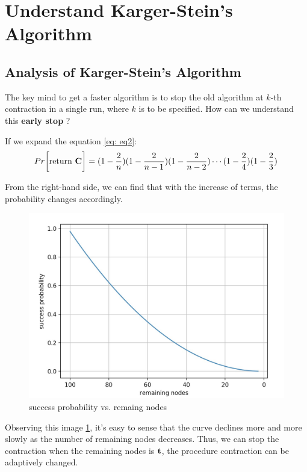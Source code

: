 \documentclass[a4paper, 12pt, titlepage]{article}
\begin{document}
\section{Understand Karger-Stein's Algorithm}

\subsection{Analysis of Karger-Stein's Algorithm}
The key mind to get a faster algorithm is to stop the old algorithm at $k$-th contraction in a single run, where $k$ is to be specified.
How can we understand this \textbf{early stop} ? 

If we expand the equation \ref{eq: eq2}:
\begin{equation}\label{eq: eq4}
    Pr \bigg[ \text{return \textbf{C}} \bigg] = (1 - \frac{2}{n})(1 - \frac{2}{n - 1})(1 - \frac{2}{n - 2}) \cdots (1- \frac{2}{4})(1 - \frac{2}{3})
\end{equation}

From the right-hand side, we can find that with the increase of terms, the probability changes accordingly.
\begin{figure}[h]\label{fig: fig1}
    \centering
    \includegraphics[scale=0.3]{images/min-cut-pic1.png}
    \caption{success probability vs. remaing nodes}
    \label{fig:fig1}
\end{figure}

Observing this image \ref{fig:fig1}, it's easy to sense that the curve declines more and more slowly as the number of remaining nodes decreases.
Thus, we can stop the contraction when the remaining nodes is ${\bf t}$, the procedure contraction can be adaptively changed.
\end{document}
